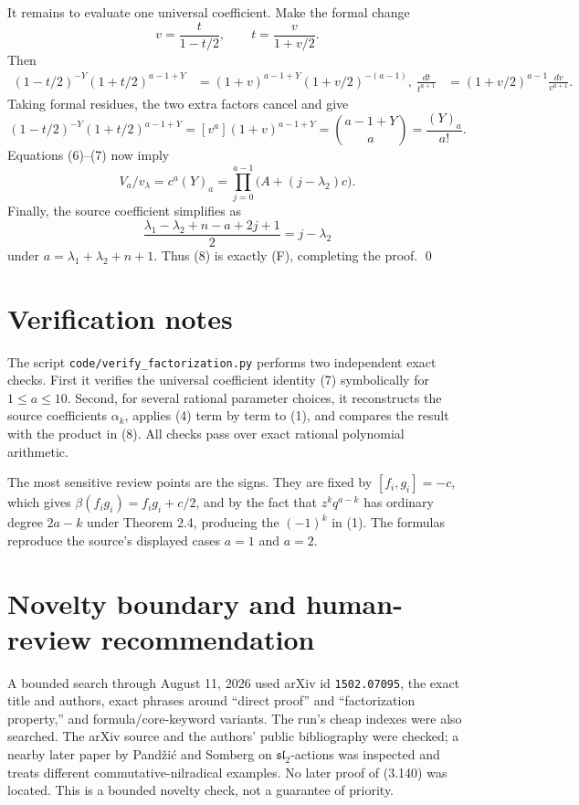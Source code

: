 \documentclass[11pt]{article}
\begin{document}
It remains to evaluate one universal coefficient.  Make the formal change
\[
 v=\frac{t}{1-t/2},\qquad t=\frac{v}{1+v/2}.
\]
Then
\begin{align*}
 (1-t/2)^{-Y}(1+t/2)^{a-1+Y}
   &=(1+v)^{a-1+Y}(1+v/2)^{-(a-1)},\
 \frac{dt}{t^{a+1}}
   &=(1+v/2)^{a-1}\frac{dv}{v^{a+1}}.
\end{align*}
Taking formal residues, the two extra factors cancel and give
\begin{equation}
 [t^a](1-t/2)^{-Y}(1+t/2)^{a-1+Y}
 =[v^a](1+v)^{a-1+Y}
 =\binom{a-1+Y}{a}=\frac{(Y)_a}{a!}.                                  \tag{7}
\end{equation}
Equations (6)--(7) now imply
\[
 V_a/v_\lambda=c^a(Y)_a
 =\prod_{j=0}^{a-1}\bigl(A+(j-\lambda_2)c\bigr).                       \tag{8}
\]
Finally, the source coefficient simplifies as
\[
 \frac{\lambda_1-\lambda_2+n-a+2j+1}{2}=j-\lambda_2
\]
under $a=\lambda_1+\lambda_2+n+1$.  Thus (8) is exactly (F), completing
the proof. \qed

\section*{Verification notes}

The script \texttt{code/verify\_factorization.py} performs two independent
exact checks.  First it verifies the universal coefficient identity (7)
symbolically for $1\le a\le10$.  Second, for several rational parameter
choices, it reconstructs the source coefficients $\alpha_k$, applies (4)
term by term to (1), and compares the result with the product in (8).  All
checks pass over exact rational polynomial arithmetic.

The most sensitive review points are the signs.  They are fixed by
$[f_i,g_i]=-c$, which gives $\beta(f_i g_i)=f_i g_i+c/2$, and by the fact
that $z^kq^{a-k}$ has ordinary degree $2a-k$ under Theorem 2.4, producing
the $(-1)^k$ in (1).  The formulas reproduce the source's displayed cases
$a=1$ and $a=2$.

\section*{Novelty boundary and human-review recommendation}

A bounded search through August 11, 2026 used arXiv id \texttt{1502.07095},
the exact title and authors, exact phrases around ``direct proof'' and
``factorization property,'' and formula/core-keyword variants.  The run's
cheap indexes were also searched.  The arXiv source and the authors' public
bibliography were checked; a nearby later paper by Pand\v{z}i\'c and Somberg
on $\mathfrak{sl}_2$-actions was inspected and treats different
commutative-nilradical examples.  No later proof of (3.140) was located.
This is a bounded novelty check, not a guarantee of priority.
\end{document}
